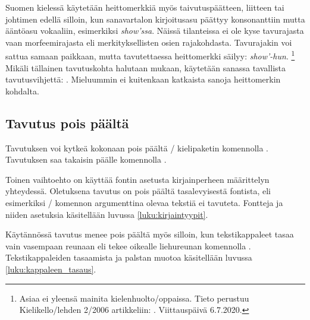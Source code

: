 Suomen kielessä käytetään heittomerkkiä myös taivutuspäätteen, liitteen
tai johtimen edellä silloin, kun sanavartalon kirjoitusasu päättyy
konsonanttiin mutta ääntöasu vokaaliin, esimerkiksi \emph{show'ssa}.
Näissä tilanteissa ei ole kyse tavurajasta vaan morfeemirajasta eli
merkityksellisten osien rajakohdasta. Tavurajakin voi sattua samaan
paikkaan, mutta tavutettaessa heittomerkki säilyy: \emph{show'-hun}.%
\footnote{Asiaa ei yleensä mainita kielenhuolto\-/oppaissa. Tieto
  perustuu Kielikello\-/lehden 2/2006 artikkeliin:
  . Viittauspäivä
  6.7.2020.} Mikäli tällainen tavutuskohta halutaan mukaan, käytetään
sanassa tavallista tavutusvihjettä:
\komentoi{-}. Mieluummin ei kuitenkaan katkaista
sanoja heittomerkin kohdalta.

\subsection{Tavutus pois päältä}

Tavutuksen voi kytkeä kokonaan pois päältä \-/
kielipaketin komennolla . Tavutuksen saa
takaisin päälle komennolla .

Toinen vaihtoehto on käyttää fontin asetusta  kirjainperheen määrittelyn yhteydessä. Oletuksena tavutus on
pois päältä tasalevyisestä fontista, eli esimerkiksi \-/
komennon argumenttina olevaa tekstiä ei tavuteta. Fontteja ja niiden
asetuksia käsitellään luvussa \ref{luku:kirjaintyypit}.

Käytännössä tavutus menee pois päältä myös silloin, kun tekstikappaleet
tasaa vain vasempaan reunaan eli tekee oikealle liehureunan komennolla
. Tekstikappaleiden tasaamista ja palstan muotoa
käsitellään luvussa \ref{luku:kappaleen_tasaus}.
